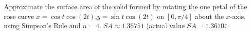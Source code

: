 {Approximate the surface area of the solid formed by rotating the one petal of the rose curve $x=\cos t\cos(2t)$,\quad $y=\sin t\cos(2t) $ on $[0,\pi/4]$ about the $x$-axis, using Simpson's Rule and $n=4$.
}
{$SA\approx 1.36751$ (actual value $SA = 1.36707$}
